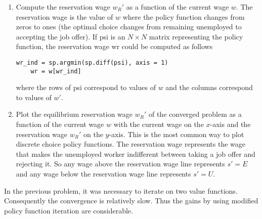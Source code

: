 \begin{problem}
\begin{enumerate}
   \item Compute the reservation wage $w_R'$ as a function of the current wage $w$.  The reservation wage is the value of $w$ where the policy function changes from zeros to ones (the optimal choice changes from remaining unemployed to accepting the job offer).  If psi is an $N\times N$ matrix representing the policy function, the reservation wage wr could be computed as follows
   \begin{lstlisting}[style = python]
    wr_ind = sp.argmin(sp.diff(psi), axis = 1)
    wr = w[wr_ind]
   \end{lstlisting}
	where the rows of psi correspond to values of $w$ and the columns correspond to values of $w'$.

   \item Plot the equilibrium reservation wage $w_R'$ of the converged problem as a function of the current wage $w$ with the current wage on the $x$-axis and the reservation wage $w_R'$ on the $y$-axis. This is the most common way to plot discrete choice policy functions. The reservation wage represents the wage that makes the unemployed worker indifferent between taking a job offer and rejecting it. So any wage above the reservation wage line represents $s' = E$ and any wage below the reservation wage line represents $s' = U$.

\end{enumerate}
\end{problem}

In the previous problem, it was necessary to iterate on two value functions.  Consequently the convergence is relatively slow.  Thus the gains by using modified policy function iteration are considerable.


